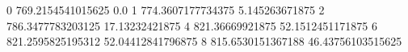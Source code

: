 0 769.2154541015625 0.0
1 774.3607177734375 5.145263671875
2 786.3477783203125 17.13232421875
4 821.36669921875 52.1512451171875
6 821.2595825195312 52.04412841796875
8 815.6530151367188 46.43756103515625
